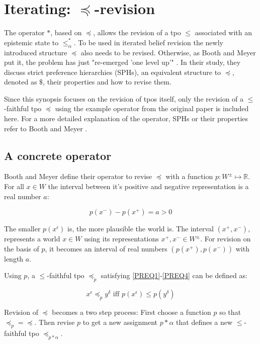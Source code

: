 \documentclass[english, 12pt]{scrartcl}
\theoremstyle{definition}
\theoremstyle{definition}
\theoremstyle{definition}
\begin{document}
\section{Iterating: $\preceq$-revision}
\label{section:iterating-preceq-revision}
The operator $\ast$, based on $\preceq$, allows the revision of a tpo $\leq$ associated with an epistemic state to $\leq_{\alpha}^{\ast}$. To be used in iterated belief revision the newly introduced structure $\preceq$ also needs to be revised. Otherwise, as Booth and Meyer put it, the problem has just "re-emerged 'one level up'" \cite{Booth2011}. In their study, they discuss strict preference hierarchies (SPHs), an equivalent structure to $\preceq$, denoted as $\$$, their properties and how to revise them.

Since this synopsis focuses on the revision of tpos itself, only the revision of a $\leq$-faithful tpo $\preceq$ using the example operator from the original paper is included here. For a more detailed explanation of the operator, SPHs or their properties refer to Booth and Meyer \cite{Booth2011}.

\subsection{A concrete operator}
Booth and Meyer define their operator to revise $\preceq$ with a function $p: W^{\pm} \mapsto \mathds{R}$. For all $x \in W$ the interval between it's positive and negative representation is a real number $a$:

\begin{equation*}
    p(x^{-}) - p(x^{+}) = a > 0
\end{equation*}

The smaller $p(x^{\epsilon})$ is, the more plausible the world is. The interval $(x^{+}, x^{-})$, represents a world $x \in W$ using its representations $x^{+}, x^{-} \in W^{\pm}$. For revision on the basis of $p$, it becomes an interval of real numbers $(p(x^{+}), p(x^{-}))$ with length $a$.

\bigskip

Using $p$, a $\leq$-faithful tpo $\preceq_{p}$ satisfying \ref{PREQ1}-\ref{PREQ4} can be defined as:

\begin{equation*}
    x^{\epsilon} \preceq_{p} y^{\delta} \textrm{ iff } p(x^{\epsilon}) \leq p(y^{\delta} )
\end{equation*}

\bigskip

Revision of $\preceq$ becomes a two step process: First choose a function $p$ so that $\preceq_{p} = \preceq$. Then revise $p$ to get a new assignment $p \ast \alpha$ that defines a new $\leq$-faithful tpo $\preceq_{p \ast \alpha}$.
\end{document}
